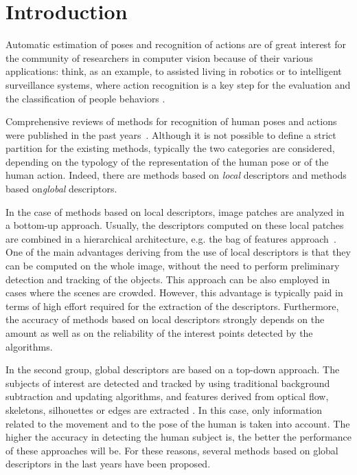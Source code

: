 \documentclass[runningheads,a4paper]{llncs}
\begin{document}
\graphicspath{ {./figures/}
			{./figures/configuration/}
			{./figures/application/}
			{./figures/dataset/}}		

\section{Introduction}
Automatic estimation of poses and recognition of actions are of great interest for the community of researchers in computer vision because of their various applications: think, as an example, to assisted living in robotics or to intelligent surveillance systems, where action recognition is a key step for the evaluation and the classification of people behaviors \cite{avss_deep}. 

Comprehensive reviews of methods for recognition of human poses and actions were published in the past years~\cite{Poppe10,Aggarwal11}. Although it is not possible to define a strict partition for the existing methods, typically the two categories are considered, depending on the typology of  the representation of the human pose or of the human action. Indeed, there are methods based on \emph{local} descriptors and methods based on\emph{global} descriptors. 


In the case of methods based on local descriptors, image patches are analyzed in a bottom-up approach. Usually, the descriptors computed on these local patches are combined in a hierarchical architecture, e.g. the bag of features approach~\cite{dollar05,Kovashka10,Lee14}.
One of the main advantages deriving from the use of local descriptors is that they can be computed on the whole image, without the need to perform preliminary detection and tracking of the objects. This approach can be also employed in cases where the scenes are crowded. However, this advantage is typically paid in terms of high effort required for the extraction of the descriptors. Furthermore, the accuracy of  methods based on local descriptors strongly depends on the amount as well as on the reliability of the interest points detected by the algorithms.

In the second group, global descriptors are based on a top-down approach. The subjects of interest are detected and tracked by using traditional background subtraction and updating algorithms, and features derived from optical flow, skeletons, silhouettes or edges are extracted \cite{yan11,wang07,sba13,ofli12}.
In this case, only information related to the movement and to the pose of the human is taken into account. The higher the accuracy in detecting the human subject is, the better the performance of these approaches will be.
For these reasons, several methods based on global descriptors in the last years have been proposed.
\end{document}
